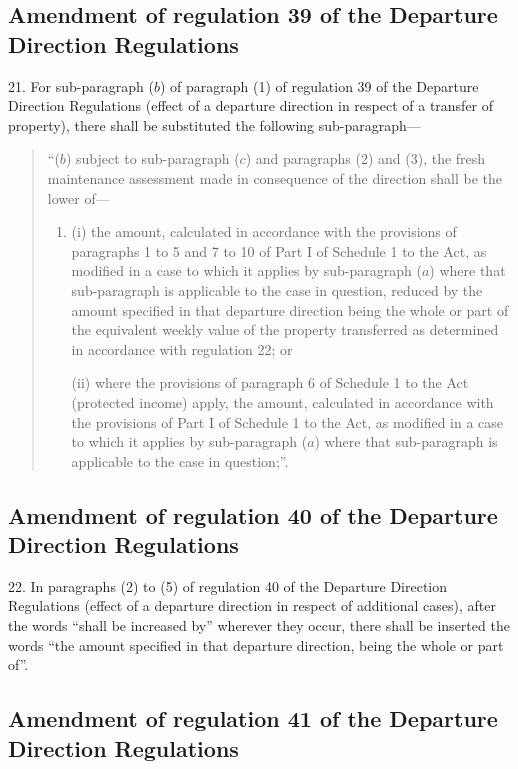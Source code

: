 \documentclass[12pt,a4paper]{article}
\begin{document}
\subsection[21. Amendment of regulation 39 of the Departure Direction Regulations]{Amendment of regulation 39 of the Departure Direction Regulations}

21.  For sub-paragraph ($b$) of paragraph (1) of regulation 39 of the Departure Direction Regulations (effect of a departure direction in respect of a transfer of property), there shall be substituted the following sub-paragraph—
\begin{quotation}
“($b$) subject to sub-paragraph ($c$) and paragraphs (2) and (3), the fresh maintenance assessment made in consequence of the direction shall be the lower of—
\begin{enumerate}\item[]
(i) the amount, calculated in accordance with the provisions of paragraphs 1 to 5 and 7 to 10 of Part I of Schedule 1 to the Act, as modified in a case to which it applies by sub-paragraph ($a$) where that sub-paragraph is applicable to the case in question, reduced by the amount specified in that departure direction being the whole or part of the equivalent weekly value of the property transferred as determined in accordance with regulation 22; or

(ii) where the provisions of paragraph 6 of Schedule 1 to the Act (protected income) apply, the amount, calculated in accordance with the provisions of Part I of Schedule 1 to the Act, as modified in a case to which it applies by sub-paragraph ($a$) where that sub-paragraph is applicable to the case in question;”.
\end{enumerate}
\end{quotation}

\subsection[22. Amendment of regulation 40 of the Departure Direction Regulations]{Amendment of regulation 40 of the Departure Direction Regulations}

22.  In paragraphs (2) to (5) of regulation 40 of the Departure Direction Regulations (effect of a departure direction in respect of additional cases), after the words “shall be increased by” wherever they occur, there shall be inserted the words “the amount specified in that departure direction, being the whole or part of”.

\subsection[23. Amendment of regulation 41 of the Departure Direction Regulations]{Amendment of regulation 41 of the Departure Direction Regulations}
\end{document}
